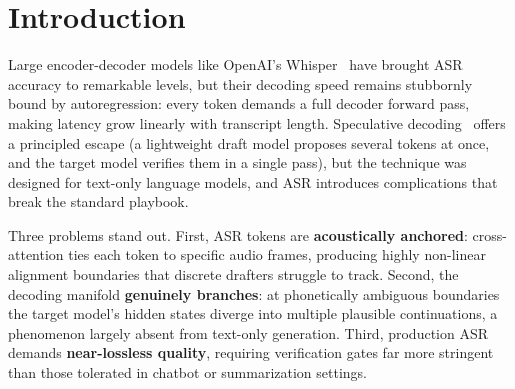 \documentclass[11pt,a4paper]{article}
\begin{document}
\section{Introduction}

Large encoder-decoder models like OpenAI's Whisper~\cite{radford2023whisper} have brought ASR accuracy to remarkable levels, but their decoding speed remains stubbornly bound by autoregression: every token demands a full decoder forward pass, making latency grow linearly with transcript length.
Speculative decoding~\cite{leviathan2023speculative,chen2023accelerating} offers a principled escape (a lightweight draft model proposes several tokens at once, and the target model verifies them in a single pass), but the technique was designed for text-only language models, and ASR introduces complications that break the standard playbook.

Three problems stand out.
First, ASR tokens are \textbf{acoustically anchored}: cross-attention ties each token to specific audio frames, producing highly non-linear alignment boundaries that discrete drafters struggle to track.
Second, the decoding manifold \textbf{genuinely branches}: at phonetically ambiguous boundaries the target model's hidden states diverge into multiple plausible continuations, a phenomenon largely absent from text-only generation.
Third, production ASR demands \textbf{near-lossless quality}, requiring verification gates far more stringent than those tolerated in chatbot or summarization settings.
\end{document}
